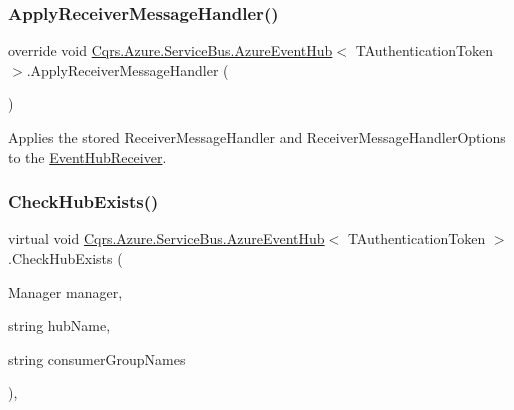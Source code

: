 \subsubsection{\texorpdfstring{Apply\+Receiver\+Message\+Handler()}{ApplyReceiverMessageHandler()}}
{\footnotesize\ttfamily override void \hyperlink{classCqrs_1_1Azure_1_1ServiceBus_1_1AzureEventHub}{Cqrs.\+Azure.\+Service\+Bus.\+Azure\+Event\+Hub}$<$ T\+Authentication\+Token $>$.Apply\+Receiver\+Message\+Handler (\begin{DoxyParamCaption}{ }\end{DoxyParamCaption})\hspace{0.3cm}{\ttfamily [protected]}}



Applies the stored Receiver\+Message\+Handler and Receiver\+Message\+Handler\+Options to the \hyperlink{classCqrs_1_1Azure_1_1ServiceBus_1_1AzureEventHub_a1b12b47dbb9b9afe2014477a2e457c35_a1b12b47dbb9b9afe2014477a2e457c35}{Event\+Hub\+Receiver}. 

\mbox{\label{classCqrs_1_1Azure_1_1ServiceBus_1_1AzureEventHub_a8fe4e3967bbeaa288c893a1d224b2268_a8fe4e3967bbeaa288c893a1d224b2268}} 
\subsubsection{\texorpdfstring{Check\+Hub\+Exists()}{CheckHubExists()}}
{\footnotesize\ttfamily virtual void \hyperlink{classCqrs_1_1Azure_1_1ServiceBus_1_1AzureEventHub}{Cqrs.\+Azure.\+Service\+Bus.\+Azure\+Event\+Hub}$<$ T\+Authentication\+Token $>$.Check\+Hub\+Exists (\begin{DoxyParamCaption}\item[{Manager}]{manager,  }\item[{string}]{hub\+Name,  }\item[{string}]{consumer\+Group\+Names }\end{DoxyParamCaption})\hspace{0.3cm}{\ttfamily [protected]}, {\ttfamily [virtual]}}



